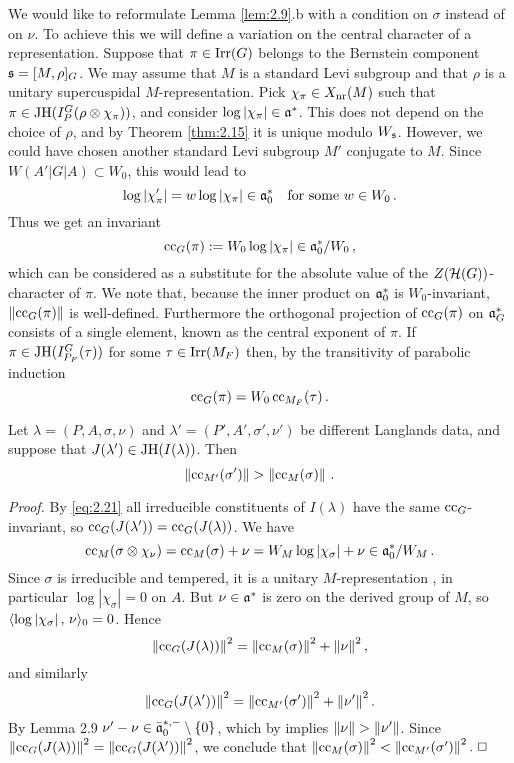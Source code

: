 We would like to reformulate Lemma \ref{lem:2.9}.b with a condition on $\sigma$ instead
of on $\nu$. To achieve this we will define a variation on the central character of a 
representation. Suppose that $\pi \in \mathrm{Irr}(G)$ belongs to the Bernstein component 
$\mathfrak s = [M ,\rho ]_G$. We may assume that $M$ is a standard Levi subgroup and that $\rho$ 
is a unitary supercuspidal $M$-representation. Pick $\chi_\pi \in X_{\mathrm{nr}} (M)$ such that 
$\pi \in \mathrm{JH}(I_P^G (\rho \otimes \chi_\pi ))$, and consider $\log |\chi_\pi | \in \mathfrak a^*$. 
This does not depend on the choice of $\rho$, and by Theorem \ref{thm:2.15} it is unique modulo 
$W_{\mathfrak s}$. However, we could have chosen another standard Levi subgroup $M'$ conjugate to 
$M$. Since $W(A' |G| A) \subset W_0$, this would lead to 
\[
\log |\chi'_\pi | = w \log | \chi_\pi | \in \mathfrak a_0^* \quad \text{for some } w \in W_0 \,.
\]
Thus we get an invariant
\[
\mathrm{cc}_G (\pi ) := W_0 \log |\chi_\pi | \in \mathfrak a_0^* / W_0 \,,
\]
which can be considered as a substitute for the absolute value of the $Z(\mathcal H (G))$-character 
of $\pi$. We note that, because the inner product on $\mathfrak a_0^*$ is $W_0$-invariant, 
$\left\| \mathrm{cc}_G (\pi ) \right\|$ is well-defined. Furthermore the orthogonal projection of $\mathrm{cc}_G (\pi )$ 
on $\mathfrak a_G^*$ consists of a single element, known as the central exponent of $\pi$. If 
$\pi \in \mathrm{JH}(I_{P_F}^G (\tau ))$ for some $\tau \in \mathrm{Irr}(M_F)$ then, by the transitivity 
of parabolic induction
\begin{equation}\label{eq:2.21}
\mathrm{cc}_G (\pi ) = W_0 \, \mathrm{cc}_{M_F} (\tau ) \,.
\end{equation}

\begin{lem}\label{lem:2.13}
Let $\lambda = (P,A,\sigma,\nu)$ and $\lambda' = (P',A',\sigma',\nu')$ be different 
Langlands data, and suppose that $J(\lambda' ) \in \mathrm{JH}(I(\lambda ))$. Then 
\[
\left\| \mathrm{cc}_{M'}(\sigma' ) \right\| > \left\| \mathrm{cc}_M (\sigma ) \right\| \,.
\]
\end{lem}
\emph{Proof.}
By \eqref{eq:2.21} all irreducible constituents of $I(\lambda )$ have the same 
$\mathrm{cc}_G$-invariant, so $\mathrm{cc}_G (J (\lambda' )) = \mathrm{cc}_G (J(\lambda ))$. We have
\[
\mathrm{cc}_M (\sigma \otimes \chi_\nu ) = \mathrm{cc}_M (\sigma ) + \nu = 
W_M \log |\chi_\sigma | + \nu \in \mathfrak a_0^* / W_M \,.
\]
Since $\sigma$ is irreducible and tempered, it is a unitary $M$-representation 
\cite[Proposition III.4.1]{Wal}, in particular $\log |\chi_\sigma | = 0$ on $A$. 
But $\nu \in \mathfrak a^*$ is zero on the derived group of $M$, 
so $\langle \log |\chi_\sigma | \,,\, \nu \rangle_0 = 0$. Hence
\[
\left\| \mathrm{cc}_G (J(\lambda )) \right\|^2 = \left\| \mathrm{cc}_M (\sigma ) \right\|^2 + \left\| \nu \right\|^2 ,
\]
and similarly
\[
\left\| \mathrm{cc}_G (J(\lambda' )) \right\|^2 = \left\| \mathrm{cc}_{M'} (\sigma' ) \right\|^2 + \left\| \nu' \right\|^2 .
\]
By Lemma 2.9 $\nu' - \nu \in \bar{\mathfrak a}_0^{*,-} \setminus \{ 0 \}$, which by 
\cite[Claim 3.5.1]{Kon} implies $\left\| \nu \right\| > \left\| \nu' \right\|$. 
Since $\left\| \mathrm{cc}_G (J(\lambda )) \right\|^2 = \left\| \mathrm{cc}_G (J(\lambda' )) \right\|^2$, we conclude that 
$\left\| \mathrm{cc}_M (\sigma ) \right\|^2 < \left\| \mathrm{cc}_{M'} (\sigma' ) \right\|^2 . \; \Box$
\vspace{4mm}




